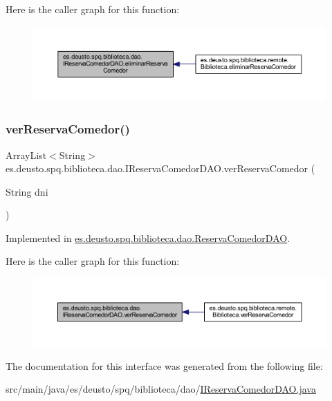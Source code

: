 Here is the caller graph for this function\+:
\nopagebreak
\begin{figure}[H]
\begin{center}
\leavevmode
\includegraphics[width=350pt]{interfacees_1_1deusto_1_1spq_1_1biblioteca_1_1dao_1_1_i_reserva_comedor_d_a_o_ab135ff48fa3d6c4ea1c4bf78405b96f4_icgraph}
\end{center}
\end{figure}
\mbox{\label{interfacees_1_1deusto_1_1spq_1_1biblioteca_1_1dao_1_1_i_reserva_comedor_d_a_o_ae20ad98f69700d0c47c0cb274e1f0e33}} 
\subsubsection{\texorpdfstring{ver\+Reserva\+Comedor()}{verReservaComedor()}}
{\footnotesize\ttfamily Array\+List$<$String$>$ es.\+deusto.\+spq.\+biblioteca.\+dao.\+I\+Reserva\+Comedor\+D\+A\+O.\+ver\+Reserva\+Comedor (\begin{DoxyParamCaption}\item[{String}]{dni }\end{DoxyParamCaption})}



Implemented in \mbox{\hyperlink{classes_1_1deusto_1_1spq_1_1biblioteca_1_1dao_1_1_reserva_comedor_d_a_o_a4cac22c7d393f3994118317472f9ab95}{es.\+deusto.\+spq.\+biblioteca.\+dao.\+Reserva\+Comedor\+D\+AO}}.

Here is the caller graph for this function\+:
\nopagebreak
\begin{figure}[H]
\begin{center}
\leavevmode
\includegraphics[width=350pt]{interfacees_1_1deusto_1_1spq_1_1biblioteca_1_1dao_1_1_i_reserva_comedor_d_a_o_ae20ad98f69700d0c47c0cb274e1f0e33_icgraph}
\end{center}
\end{figure}


The documentation for this interface was generated from the following file\+:\begin{DoxyCompactItemize}
\item 
src/main/java/es/deusto/spq/biblioteca/dao/\mbox{\hyperlink{_i_reserva_comedor_d_a_o_8java}{I\+Reserva\+Comedor\+D\+A\+O.\+java}}\end{DoxyCompactItemize}
